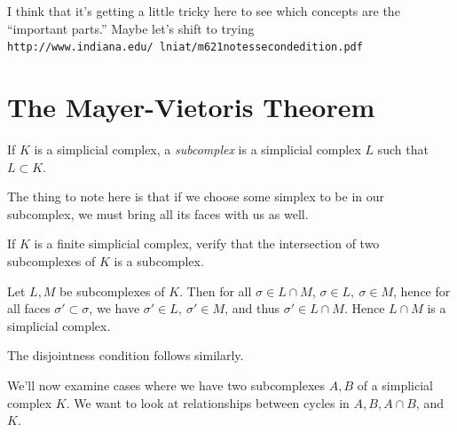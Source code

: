 \begin{note}
  \color{green} I think that it's getting a little tricky here to see which
  concepts are the ``important parts.'' Maybe let's shift to trying
  \texttt{http://www.indiana.edu/~lniat/m621notessecondedition.pdf}
\end{note}

\section{The Mayer-Vietoris Theorem}
\begin{definition}[Subcomplex]
  If $K$ is a simplicial complex, a \emph{subcomplex} is a simplicial complex
  $L$ such that $L \subset K$.
\end{definition}
\begin{note}
  The thing to note here is that if we choose some simplex to be in our
  subcomplex, we must bring all its faces with us as well.
\end{note}
\begin{problem}[16.31]
  If $K$ is a finite simplicial complex, verify that the intersection of two
  subcomplexes of $K$ is a subcomplex.
\end{problem}
\begin{solution}
  Let $L, M$ be subcomplexes of $K$. Then for all $\sigma \in L \cap
  M$, $\sigma \in L,\ \sigma \in M$, hence for all faces $\sigma'
  \subset \sigma$, we have $\sigma' \in L,\ \sigma' \in M$, and thus
  $\sigma'\in L \cap M$. Hence $L \cap M$ is a simplicial complex.

  The disjointness condition follows similarly.
\end{solution}

We'll now examine cases where we have two subcomplexes $A,B$ of a
simplicial complex $K$. We want to look at relationships between
cycles in $A,B, A\cap B$, and $K$.

